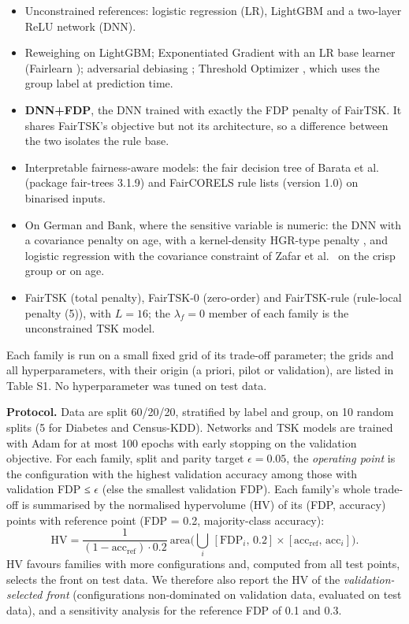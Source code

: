 \begin{itemize}
\tightlist
\item
  Unconstrained references: logistic regression (LR), LightGBM \cite{lightgbm} and a two-layer ReLU network (DNN).
\item
  Reweighing \cite{kamiran} on LightGBM; Exponentiated Gradient \cite{agarwal} with an LR base learner (Fairlearn \cite{fairlearn}); adversarial debiasing \cite{zhang}; Threshold Optimizer \cite{hardt}, which uses the group label at prediction time.
\item
  \textbf{DNN+FDP}, the DNN trained with exactly the FDP penalty of FairTSK. It shares FairTSK's objective but not its architecture, so a difference between the two isolates the rule base.
\item
  Interpretable fairness-aware models: the fair decision tree of Barata et al.~\cite{barata} (package fair-trees 3.1.9) and FairCORELS rule lists \cite{aivodji} (version 1.0) on binarised inputs.
\item
  On German and Bank, where the sensitive variable is numeric: the DNN with a covariance penalty on age, with a kernel-density HGR-type penalty \cite{mary}, and logistic regression with the covariance constraint of Zafar et al.~\cite{zafar} on the crisp group or on age.
\item
  FairTSK (total penalty), FairTSK-0 (zero-order) and FairTSK-rule (rule-local penalty (5)), with \(L = 16\); the \(\lambda_f = 0\) member of each family is the unconstrained TSK model.
\end{itemize}

Each family is run on a small fixed grid of its trade-off parameter; the grids and all hyperparameters, with their origin (a priori, pilot or validation), are listed in Table S1. No hyperparameter was tuned on test data.

\textbf{Protocol.} Data are split 60/20/20, stratified by label and group, on 10 random splits (5 for Diabetes and Census-KDD). Networks and TSK models are trained with Adam \cite{adam} for at most 100 epochs with early stopping on the validation objective. For each family, split and parity target \(\epsilon = 0.05\), the \emph{operating point} is the configuration with the highest validation accuracy among those with validation FDP ≤ \(\epsilon\) (else the smallest validation FDP). Each family's whole trade-off is summarised by the normalised hypervolume (HV) \cite{zitzler} of its (FDP, accuracy) points with reference point (FDP = 0.2, majority-class accuracy): \[\mathrm{HV} = \frac{1}{(1 - \text{acc}_{\text{ref}})\cdot 0.2}\ \mathrm{area}\Big(\bigcup_i\,[\text{FDP}_i,\,0.2] \times [\text{acc}_{\text{ref}},\,\text{acc}_i]\Big). \tag{7}\] HV favours families with more configurations and, computed from all test points, selects the front on test data. We therefore also report the HV of the \emph{validation-selected front} (configurations non-dominated on validation data, evaluated on test data), and a sensitivity analysis for the reference FDP of 0.1 and 0.3.

